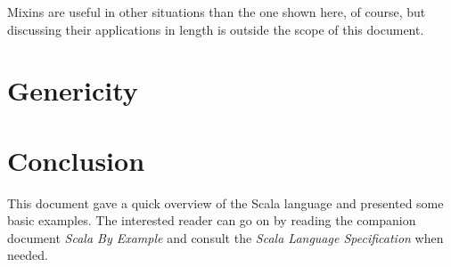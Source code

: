 \documentclass[a4paper,12pt,twoside,titlepage]{article}
\newcommand{\langname}[1]{#1\xspace}
\newcommand{\Scala}{\langname{Scala}}
\begin{document}
Mixins are useful in other situations than the one shown here, of
course, but discussing their applications in length is outside the
scope of this document.


\section{Genericity}
\label{sec:genericity}



\section{Conclusion}
\label{sec:conclusion}

This document gave a quick overview of the \Scala language and
presented some basic examples. The interested reader can go on by
reading the companion document \textit{Scala By Example\/} and consult
the \textit{Scala Language Specification\/} when needed.
\end{document}
